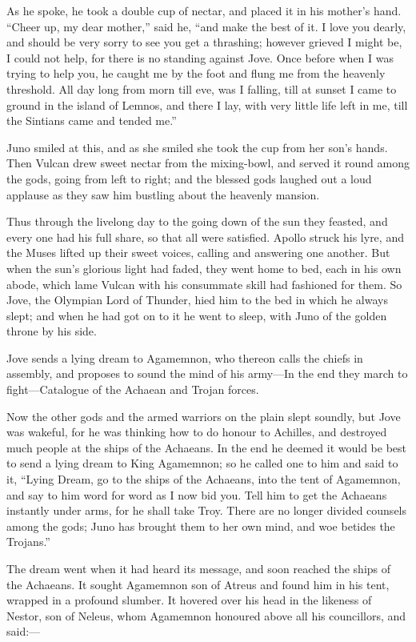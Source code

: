 As he spoke, he took a double cup of nectar, and placed it in his mother’s
hand. “Cheer up, my dear mother,” said he, “and make the best of it. I
love you dearly, and should be very sorry to see you get a thrashing;
however grieved I might be, I could not help, for there is no standing
against Jove. Once before when I was trying to help you, he caught me by
the foot and flung me from the heavenly threshold. All day long from morn
till eve, was I falling, till at sunset I came to ground in the island of
Lemnos, and there I lay, with very little life left in me, till the
Sintians came and tended me.”

Juno smiled at this, and as she smiled she took the cup from her son’s
hands. Then Vulcan drew sweet nectar from the mixing-bowl, and served it
round among the gods, going from left to right; and the blessed gods
laughed out a loud applause as they saw him bustling about the heavenly
mansion.

Thus through the livelong day to the going down of the sun they feasted,
and every one had his full share, so that all were satisfied. Apollo
struck his lyre, and the Muses lifted up their sweet voices, calling and
answering one another. But when the sun’s glorious light had faded, they
went home to bed, each in his own abode, which lame Vulcan with his
consummate skill had fashioned for them. So Jove, the Olympian Lord of
Thunder, hied him to the bed in which he always slept; and when he had got
on to it he went to sleep, with Juno of the golden throne by his side.


Jove sends a lying dream to Agamemnon, who thereon calls the chiefs in
assembly, and proposes to sound the mind of his army—In the end they
march to fight—Catalogue of the Achaean and Trojan forces.

Now the other gods and the armed warriors on the plain slept soundly, but
Jove was wakeful, for he was thinking how to do honour to Achilles, and
destroyed much people at the ships of the Achaeans. In the end he deemed
it would be best to send a lying dream to King Agamemnon; so he called one
to him and said to it, “Lying Dream, go to the ships of the Achaeans, into
the tent of Agamemnon, and say to him word for word as I now bid you. Tell
him to get the Achaeans instantly under arms, for he shall take Troy.
There are no longer divided counsels among the gods; Juno has brought them
to her own mind, and woe betides the Trojans.”

The dream went when it had heard its message, and soon reached the ships
of the Achaeans. It sought Agamemnon son of Atreus and found him in his
tent, wrapped in a profound slumber. It hovered over his head in the
likeness of Nestor, son of Neleus, whom Agamemnon honoured above all his
councillors, and said:—

